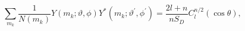 \begin{equation}
\sum_{m_{k}}\frac{1}{N(m_{k})}Y(m_{k};\vartheta , \phi
)Y^{*}(m_{k};\vartheta ^{\prime },\phi ^{\prime
})=\frac{2l+n}{nS_{D}}C_{l}^{n/2}(\cos \theta ), \label{adtheorem}
\end{equation}

